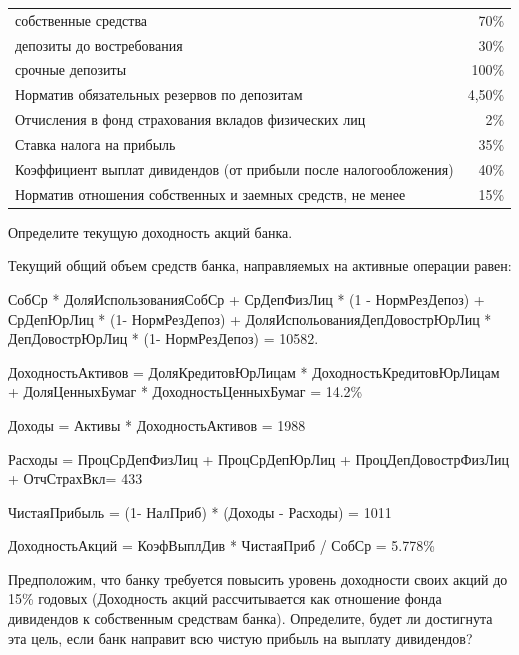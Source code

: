 \documentclass[12pt, table, a4paper,twoside]{exam}
\begin{document}
\begin{questions}
\begin{tabularx}{\linewidth}[b]{@{}>{\raggedright\arraybackslash}Xr@{}}
		собственные средства & 70\% \\
		депозиты до востребования & 30\% \\
		срочные депозиты & 100\% \\
		\midrule
		Норматив обязательных резервов по депозитам & 4,50\% \\
		Отчисления в фонд страхования вкладов физических лиц & 2\% \\
		Ставка налога на прибыль & 35\% \\
		Коэффициент выплат дивидендов (от прибыли после налогообложения) & 40\% \\
		Норматив отношения собственных и заемных средств, не менее & 15\% \\
		\bottomrule
	\end{tabularx}%
\noaddpoints

\begin{subparts}
	\subpart[5] Определите текущую доходность акций банка.
	
	\begin{solution}[12em]
		
	Текущий общий объем средств банка, направляемых на активные операции равен:
	
	СобСр * ДоляИспользованияСобСр + СрДепФизЛиц * (1 - НормРезДепоз) + СрДепЮрЛиц * (1- НормРезДепоз)  + ДоляИспольованияДепДовострЮрЛиц * ДепДовострЮрЛиц * (1- НормРезДепоз) = 10582.	
	
	
	ДоходностьАктивов = ДоляКредитовЮрЛицам * ДоходностьКредитовЮрЛицам + ДоляЦенныхБумаг * ДоходностьЦенныхБумаг = 14.2\%
	
	Доходы = Активы * ДоходностьАктивов = 1988
			
	Расходы = ПроцСрДепФизЛиц + ПроцСрДепЮрЛиц + ПроцДепДовострФизЛиц + ОтчСтрахВкл= 433
			
	ЧистаяПрибыль = (1- НалПриб) * (Доходы - Расходы) = 1011
			
	ДоходностьАкций = КоэфВыплДив * ЧистаяПриб / СобСр = 5.778\%
	
	\end{solution}
	
	\subpart[5] Предположим, что банку требуется повысить уровень доходности своих акций до 15\% годовых (Доходность акций рассчитывается как отношение фонда дивидендов к собственным средствам банка). Определите, будет ли достигнута эта цель, если банк направит всю чистую прибыль на выплату дивидендов?
	
	\begin{solution}[12em]
		

\end{solution}
\end{subparts}
\end{questions}
\end{document}
